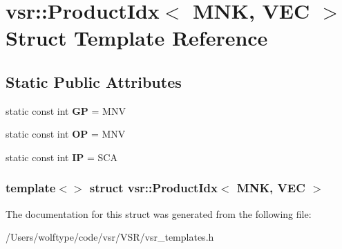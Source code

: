 \hypertarget{structvsr_1_1_product_idx_3_01_m_n_k_00_01_v_e_c_01_4}{\section{vsr\-:\-:Product\-Idx$<$ M\-N\-K, V\-E\-C $>$ Struct Template Reference}
\label{structvsr_1_1_product_idx_3_01_m_n_k_00_01_v_e_c_01_4}
}
\subsection*{Static Public Attributes}
\begin{DoxyCompactItemize}
\item 
\hypertarget{structvsr_1_1_product_idx_3_01_m_n_k_00_01_v_e_c_01_4_a9e226da4a3b51ef411e1eaa3fb136505}{static const int {\bfseries G\-P} = M\-N\-V}\label{structvsr_1_1_product_idx_3_01_m_n_k_00_01_v_e_c_01_4_a9e226da4a3b51ef411e1eaa3fb136505}

\item 
\hypertarget{structvsr_1_1_product_idx_3_01_m_n_k_00_01_v_e_c_01_4_aa5cce6f5cdabe8337de6d53f914be453}{static const int {\bfseries O\-P} = M\-N\-V}\label{structvsr_1_1_product_idx_3_01_m_n_k_00_01_v_e_c_01_4_aa5cce6f5cdabe8337de6d53f914be453}

\item 
\hypertarget{structvsr_1_1_product_idx_3_01_m_n_k_00_01_v_e_c_01_4_ae090737e67f59abdfaf39ef23cce3a3f}{static const int {\bfseries I\-P} = S\-C\-A}\label{structvsr_1_1_product_idx_3_01_m_n_k_00_01_v_e_c_01_4_ae090737e67f59abdfaf39ef23cce3a3f}

\end{DoxyCompactItemize}
\subsubsection*{template$<$$>$ struct vsr\-::\-Product\-Idx$<$ M\-N\-K, V\-E\-C $>$}



The documentation for this struct was generated from the following file\-:\begin{DoxyCompactItemize}
\item 
/\-Users/wolftype/code/vsr/\-V\-S\-R/vsr\-\_\-templates.\-h\end{DoxyCompactItemize}
